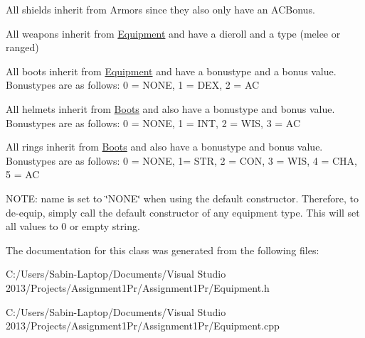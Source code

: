 All shields inherit from Armors since they also only have an A\+C\+Bonus.

All weapons inherit from \hyperlink{class_equipment}{Equipment} and have a dieroll and a type (melee or ranged)

All boots inherit from \hyperlink{class_equipment}{Equipment} and have a bonustype and a bonus value. Bonustypes are as follows\+: 0 = N\+O\+NE, 1 = D\+EX, 2 = AC

All helmets inherit from \hyperlink{class_boots}{Boots} and also have a bonustype and bonus value. Bonustypes are as follows\+: 0 = N\+O\+NE, 1 = I\+NT, 2 = W\+IS, 3 = AC

All rings inherit from \hyperlink{class_boots}{Boots} and also have a bonustype and bonus value. Bonustypes are as follows\+: 0 = N\+O\+NE, 1= S\+TR, 2 = C\+ON, 3 = W\+IS, 4 = C\+HA, 5 = AC

N\+O\+TE\+: name is set to \char`\"{}\+N\+O\+N\+E\char`\"{} when using the default constructor. Therefore, to de-\/equip, simply call the default constructor of any equipment type. This will set all values to 0 or empty string. 

The documentation for this class was generated from the following files\+:\begin{DoxyCompactItemize}
\item 
C\+:/\+Users/\+Sabin-\/\+Laptop/\+Documents/\+Visual Studio 2013/\+Projects/\+Assignment1\+Pr/\+Assignment1\+Pr/Equipment.\+h\item 
C\+:/\+Users/\+Sabin-\/\+Laptop/\+Documents/\+Visual Studio 2013/\+Projects/\+Assignment1\+Pr/\+Assignment1\+Pr/Equipment.\+cpp\end{DoxyCompactItemize}
